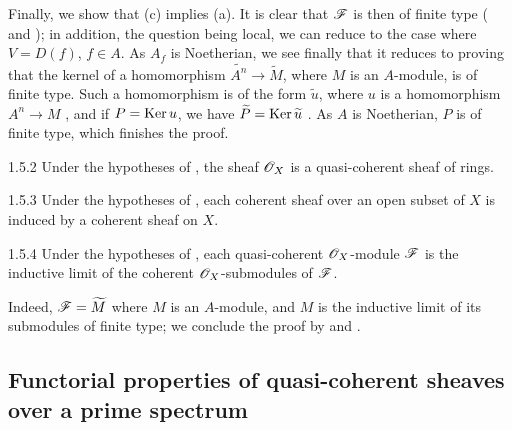 Finally, we show that (c) implies (a). It is clear that $\mathscr{F}$ is then of finite type
( and ); in addition, the question being local, we can
reduce to the case where $V=D(f)$, $f\in A$. As $A_f$ is Noetherian, we see finally that it
reduces to proving that the kernel of a homomorphism $\widetilde{A^n}\to\widetilde{M}$, where
$M$ is an $A$-module, is of finite type. Such a homomorphism is of the form $\widetilde{u}$,
where $u$ is a homomorphism $A^n\to M$ , and if $P={\mathop{\mathrm{Ker}}\nolimits}\, u$, we have
$\widetilde{P}={\mathop{\mathrm{Ker}}\nolimits}\,\widetilde{u}$ . As $A$ is Noetherian, $P$ is of finite
type, which finishes the proof.

\begin{envs}[Corollary]{1.5.2}
\label{cor-1.1.5.2}
Under the hypotheses of , the sheaf $\mathscr{O}_X$ is a quasi-coherent sheaf of
rings.
\end{envs}

\begin{envs}[Corollary]{1.5.3}
\label{cor-1.1.5.3}
Under the hypotheses of , each coherent sheaf over an open subset of $X$ is
induced by a coherent sheaf on $X$.
\end{envs}

\begin{envs}[Corollary]{1.5.4}
\label{cor-1.1.5.4}
Under the hypotheses of , each quasi-coherent $\mathscr{O}_X$-module $\mathscr{F}$ is
the inductive limit of the coherent $\mathscr{O}_X$-submodules of $\mathscr{F}$.
\end{envs}

Indeed, $\mathscr{F}=\widetilde{M}$ where $M$ is an $A$-module, and $M$ is the inductive limit of
its submodules of finite type; we conclude the proof by  and
.

\subsection{Functorial properties of quasi-coherent sheaves over a prime spectrum}
\label{1-schemes-1.6}

